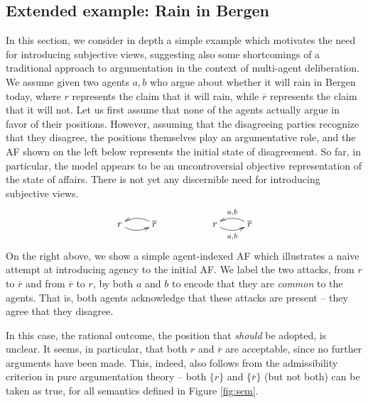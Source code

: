 \documentclass[greybox]{svmult}
\renewcommand{\bar}[1]{\overline{#1}}
\begin{document}
\subsection{Extended example: Rain in Bergen}\label{ex:run}

In this section, we consider in depth a simple example which motivates the need for introducing subjective views, suggesting also some shortcomings of a traditional approach to argumentation in the context of multi-agent deliberation. We assume given two agents $a,b$ who argue about whether it will rain in Bergen today, where $r$ represents the claim that it will rain, while $\overline r$ represents the claim that it will not. Let us first assume that none of the agents actually argue in favor of their positions. However, assuming that the disagreeing parties recognize that they disagree, the positions themselves play an argumentative role, and the AF shown on the left below represents the initial state of disagreement. So far, in particular, the model appears to be an uncontroversial objective representation of the state of affairs. There is not yet any discernible need for introducing subjective views. 
$$
\begin{array}{ccc}
\xymatrix{ r \ar@/_/[r] & \overline r \ar@/_/[l] } & \hspace{3em} &
\xymatrix{ r \ar@/_/[r]_{{ a},{ b}} & \bar r \ar@/_/[l]_{{ a},{ b}} }
\end{array}
$$
On the right above, we show a simple agent-indexed AF which illustrates a naive attempt at introducing agency to the initial AF. We label the two attacks, from $r$ to $\overline r$ and from $\overline r$ to $r$, by both $a$ and $b$ to encode that they are \emph{common} to the agents. That is, both agents acknowledge that these attacks are present -- they agree that they disagree.

In this case, the rational outcome, the position that \emph{should} be adopted, is unclear. It seems, in particular, that both $r$ and $\bar r$ are acceptable, since no further arguments have been made. This, indeed, also follows from the admissibility criterion in pure argumentation theory -- both $\{r\}$ and $\{\bar r\}$ (but not both) can be taken as true, for all semantics defined in Figure \ref{fig:sem}.
\end{document}
